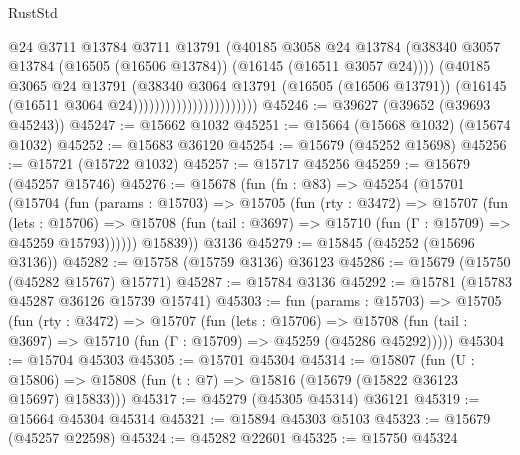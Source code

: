 \begin{lexlean}{RustStd}
\begin{coremodule}
                                          @24
                                          @3711
                                          @13784
                                          @3711
                                          @13791
                                          (@40185
                                            @3058
                                            @24
                                            @13784
                                            (@38340
                                              @3057
                                              @13784
                                              (@16505 (@16506 @13784))
                                              (@16145 (@16511 @3057 @24))))
                                          (@40185
                                            @3065
                                            @24
                                            @13791
                                            (@38340
                                              @3064
                                              @13791
                                              (@16505 (@16506 @13791))
                                              (@16145 (@16511 @3064 @24)))))))))))))))))))))))
@45246 := @39627 (@39652 (@39693 @45243))
@45247 := @15662 @1032
@45251 := @15664 (@15668 @1032) (@15674 @1032)
@45252 := @15683 @36120
@45254 := @15679 (@45252 @15698)
@45256 := @15721 (@15722 @1032)
@45257 := @15717 @45256
@45259 := @15679 (@45257 @15746)
@45276 := @15678
    (fun (fn : @83) =>
    @45254
      (@15701
        (@15704
          (fun (params : @15703) =>
          @15705
            (fun (rty : @3472) =>
            @15707
              (fun (lets : @15706) =>
              @15708 (fun (tail : @3697) => @15710 (fun (Γ : @15709) => @45259 @15793))))))
        @15839))
    @3136
@45279 := @15845 (@45252 (@15696 @3136))
@45282 := @15758 (@15759 @3136) @36123
@45286 := @15679 (@15750 (@45282 @15767) @15771)
@45287 := @15784 @3136
@45292 := @15781 (@15783 @45287 @36126 @15739 @15741)
@45303 := fun (params : @15703) =>
  @15705
    (fun (rty : @3472) =>
    @15707
      (fun (lets : @15706) =>
      @15708 (fun (tail : @3697) => @15710 (fun (Γ : @15709) => @45259 (@45286 @45292)))))
@45304 := @15704 @45303
@45305 := @15701 @45304
@45314 := @15807
    (fun (U : @15806) => @15808 (fun (t : @7) => @15816 (@15679 (@15822 @36123 @15697) @15833)))
@45317 := @45279 (@45305 @45314) @36121
@45319 := @15664 @45304 @45314
@45321 := @15894 @45303 @5103
@45323 := @15679 (@45257 @22598)
@45324 := @45282 @22601
@45325 := @15750 @45324

\end{coremodule}
\end{lexlean}
